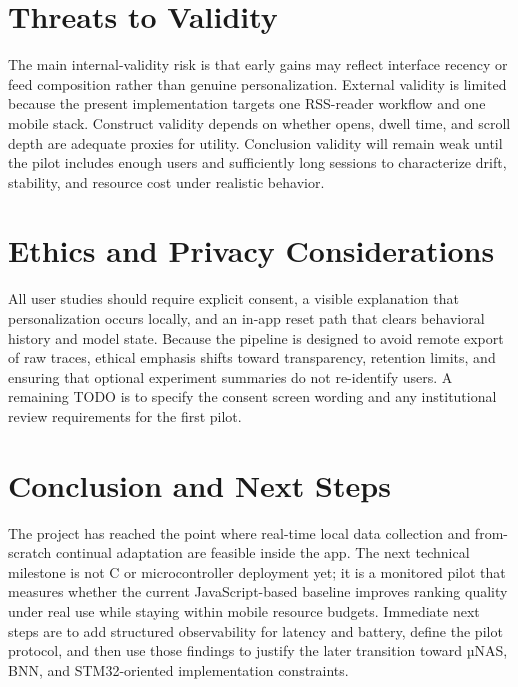\documentclass[11pt]{article}
\begin{document}
\section{Threats to Validity}
The main internal-validity risk is that early gains may reflect interface recency or feed composition rather than genuine personalization. External validity is limited because the present implementation targets one RSS-reader workflow and one mobile stack. Construct validity depends on whether opens, dwell time, and scroll depth are adequate proxies for utility. Conclusion validity will remain weak until the pilot includes enough users and sufficiently long sessions to characterize drift, stability, and resource cost under realistic behavior.

\section{Ethics and Privacy Considerations}
All user studies should require explicit consent, a visible explanation that personalization occurs locally, and an in-app reset path that clears behavioral history and model state. Because the pipeline is designed to avoid remote export of raw traces, ethical emphasis shifts toward transparency, retention limits, and ensuring that optional experiment summaries do not re-identify users. A remaining TODO is to specify the consent screen wording and any institutional review requirements for the first pilot.

\section{Conclusion and Next Steps}
The project has reached the point where real-time local data collection and from-scratch continual adaptation are feasible inside the app. The next technical milestone is not C or microcontroller deployment yet; it is a monitored pilot that measures whether the current JavaScript-based baseline improves ranking quality under real use while staying within mobile resource budgets. Immediate next steps are to add structured observability for latency and battery, define the pilot protocol, and then use those findings to justify the later transition toward µNAS, BNN, and STM32-oriented implementation constraints.



\end{document}
